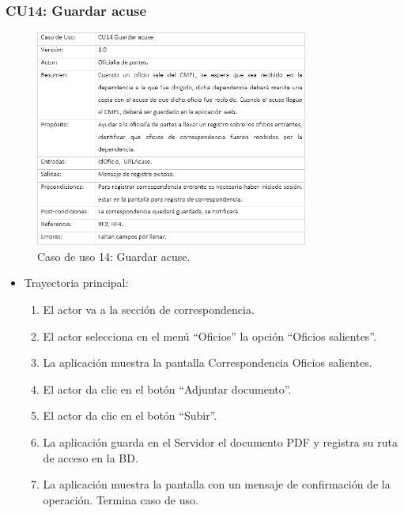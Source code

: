 		\subsubsection{CU14: Guardar acuse}
\begin{figure}[htbp!]
		\centering
			\includegraphics[width=0.8\textwidth]{images/CU/CU14}
		\caption{Caso de uso 14: Guardar acuse.}
		\label{Tabla}
	\end{figure}
	
\begin{itemize}
	\item Trayectoria principal:
	\begin{enumerate}
		\item 	El actor va a la sección de correspondencia.
\item	El actor selecciona en el menú “Oficios” la opción “Oficios salientes”.
\item	La aplicación muestra la pantalla  Correspondencia Oficios salientes.
\item	El actor da clic en el botón “Adjuntar documento”.
\item	El actor da clic en el botón “Subir”.
\item	La aplicación guarda en el Servidor el documento PDF y registra su ruta de acceso en la BD.
\item	La aplicación muestra la pantalla  con un mensaje de confirmación de la operación.
Termina caso de uso.

	\end{enumerate}
	
\end{itemize}

